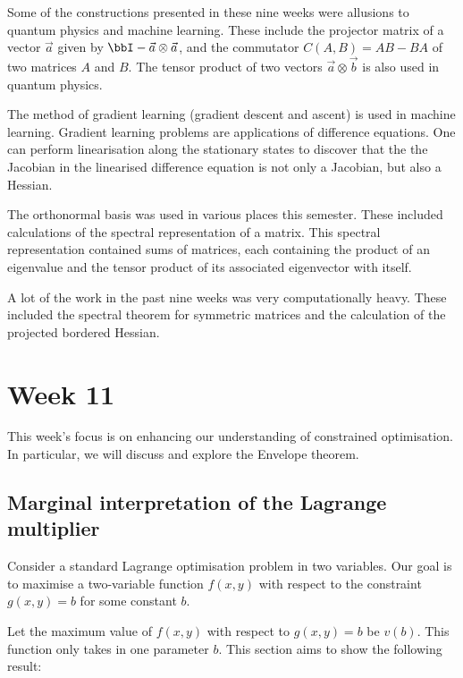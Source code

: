\documentclass[a4paper, 12pt,oneside,openany]{book}
\begin{document}
Some of the constructions presented in these nine weeks were allusions to quantum physics and machine learning. These include the projector matrix of a vector $\vec{a}$ given by $\bbI - \vec{a} \otimes \vec{a}$, and the commutator $C(A, B)=AB-BA$ of two matrices $A$ and $B$. The tensor product of two vectors $\vec{a} \otimes \vec{b}$ is also used in quantum physics. 

The method of gradient learning (gradient descent and ascent) is used in machine learning. Gradient learning problems are applications of difference equations. One can perform linearisation along the stationary states to discover that the the Jacobian in the linearised difference equation is not only a Jacobian, but also a Hessian.

The orthonormal basis was used in various places this semester. These included calculations of the spectral representation of a matrix. This spectral representation contained sums of matrices, each containing the product of  an eigenvalue and the tensor product of its associated eigenvector with itself.

A lot of the work in the past nine weeks was very computationally heavy. These included the spectral theorem for symmetric matrices and the calculation of the projected bordered Hessian.

\chapter{Week 11}

This week's focus is on enhancing our understanding of constrained optimisation. In particular, we will discuss and explore the Envelope theorem.

\section{Marginal interpretation of the Lagrange multiplier}

Consider a standard Lagrange optimisation problem in two variables. Our goal is to maximise a two-variable function $f(x, y)$ with respect to the constraint $g(x, y) = b$ for some constant $b$. 

Let the maximum value of $f(x, y)$ with respect to $g(x, y)=b$ be $v(b)$. This function only takes in one parameter $b$. This section aims to show the following result:

\end{document}
